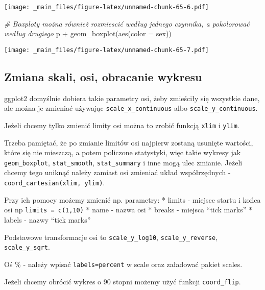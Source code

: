 \documentclass[
]{book}
\newenvironment{Shaded}{\begin{snugshade}}{\end{snugshade}}
\newcommand{\AttributeTok}[1]{\textcolor[rgb]{0.77,0.63,0.00}{#1}}
\newcommand{\CommentTok}[1]{\textcolor[rgb]{0.56,0.35,0.01}{\textit{#1}}}
\newcommand{\FunctionTok}[1]{\textcolor[rgb]{0.00,0.00,0.00}{#1}}
\newcommand{\NormalTok}[1]{#1}
\newcommand{\SpecialCharTok}[1]{\textcolor[rgb]{0.00,0.00,0.00}{#1}}
\begin{document}
\texttt{[image: \_main\_files/figure-latex/unnamed-chunk-65-6.pdf]}

\begin{Shaded}
\begin{Highlighting}[]
\CommentTok{\# Boxploty można również rozmiescić według jednego czynnika, a pokolorować według drugiego}
\NormalTok{p }\SpecialCharTok{+} \FunctionTok{geom\_boxplot}\NormalTok{(}\FunctionTok{aes}\NormalTok{(}\AttributeTok{color =}\NormalTok{ sex))}
\end{Highlighting}
\end{Shaded}

\texttt{[image: \_main\_files/figure-latex/unnamed-chunk-65-7.pdf]}

\hypertarget{zmiana-skali-osi-obracanie-wykresu}{%
\subsection{Zmiana skali, osi, obracanie wykresu}\label{zmiana-skali-osi-obracanie-wykresu}}

ggplot2 domyślnie dobiera takie parametry osi, żeby zmieściły się wszystkie dane, ale można je zmieniać używając \texttt{scale\_x\_continuous} albo \texttt{scale\_y\_continuous}.

Jeżeli chcemy tylko zmienić limity osi można to zrobić funkcją \texttt{xlim} i \texttt{ylim}.

Trzeba pamiętać, że po zmianie limitów osi najpierw zostaną usunięte wartości, które się nie mieszczą, a potem policzone statystyki, więc takie wykresy jak \texttt{geom\_boxplot}, \texttt{stat\_smooth}, \texttt{stat\_summary} i inne mogą ulec zmianie. Jeżeli chcemy tego uniknąć należy zamiast osi zmieniać układ współrzędnych - \texttt{coord\_cartesian(xlim,\ ylim)}.

Przy ich pomocy możemy zmienić np. parametry:
* limits - miejsce startu i końca osi np \texttt{limits\ =\ c(1,10)}
* name - nazwa osi
* breaks - miejsca ``tick marks''
* labels - nazwy ``tick marks''

Podstawowe transformacje osi to \texttt{scale\_y\_log10}, \texttt{scale\_y\_reverse}, \texttt{scale\_y\_sqrt}.

Oś \% - należy wpisać \texttt{labels=percent} w scale oraz załadować pakiet scales.

Jeżeli chcemy obrócić wykres o 90 stopni możemy użyć funkcji \texttt{coord\_flip}.
\end{document}
